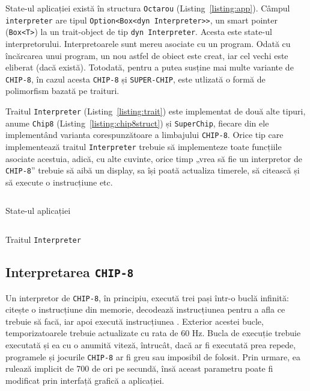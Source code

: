 \documentclass[a4paper]{article}
\begin{document}
State-ul aplicației există în structura \texttt{Octarou} (Listing~\ref{listing:app}). Câmpul \texttt{interpreter} are tipul
\texttt{Option<Box<dyn Interpreter>>}, un smart pointer (\texttt{Box<T>}) la un trait-object de tip \texttt{dyn Interpreter}.
Acesta este state-ul interpretorului. Interpretoarele sunt mereu asociate cu un program. Odată cu încărcarea unui program, un
nou astfel de obiect este creat, iar cel vechi este eliberat (dacă există). Totodată, pentru a putea susține mai multe variante
de \texttt{CHIP-8}, în cazul acesta \texttt{CHIP-8} și \texttt{SUPER-CHIP}, este utlizată o formă de polimorfism bazată pe traituri.

Traitul \texttt{Interpreter} (Listing~\ref{listing:trait}) este implementat de două alte tipuri, anume \texttt{Chip8} (Listing~\ref{listing:chip8struct})
și \texttt{SuperChip}, fiecare din ele implementând varianta corespunzătoare a limbajului \texttt{CHIP-8}. Orice tip care implementează traitul
\texttt{Interpreter} trebuie să implementeze toate funcțiile asociate acestuia, adică, cu alte cuvinte, orice timp „vrea să fie un interpretor
de \texttt{CHIP-8}” trebuie să aibă un display, sa își poată actualiza timerele, să citească și să execute o instrucțiune etc.

\begin{listing}[hbt!]
	\begin{center}
		\inputminted{rust}{codeblocks/app-struct.rs}
		\caption{State-ul aplicației}\label{listing:app}
	\end{center}
\end{listing}

\begin{listing}[hbt!]
	\begin{center}
		\inputminted{rust}{codeblocks/interpreter-trait.rs}
		\caption{Traitul \texttt{Interpreter}}\label{listing:trait}
	\end{center}
\end{listing}

\subsection{Interpretarea \texttt{CHIP-8}}
Un interpretor de \texttt{CHIP-8}, în principiu, execută trei pași într-o buclă infinită: citește o instrucțiune din memorie, decodează
instrucțiunea pentru a afla ce trebuie să facă, iar apoi execută instrucțiunea \cite{langhoff}. Exterior acestei bucle, temporizatoarele
trebuie actualizate cu rata de 60 Hz. Bucla de execuție trebuie executată și ea cu o anumită viteză, întrucât, dacă ar fi executată prea
repede, programele și jocurile \texttt{CHIP-8} ar fi greu sau imposibil de folosit. Prin urmare, ea rulează implicit de 700 de ori pe secundă,
însă aceast parametru poate fi modificat prin interfață grafică a aplicației.
\end{document}
